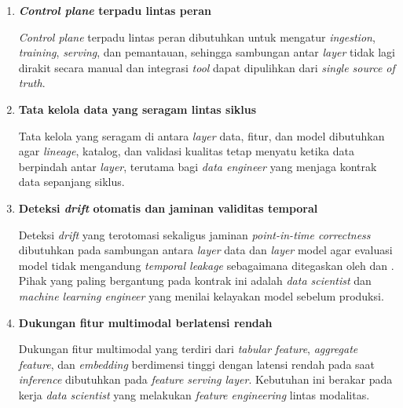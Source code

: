 \vspace{0.5em}
\begin{enumerate}
    \item \textbf{\textit{Control plane} terpadu lintas peran}

    \textit{Control plane} terpadu lintas peran dibutuhkan untuk mengatur \textit{ingestion}, \textit{training}, \textit{serving}, dan pemantauan, sehingga sambungan antar \textit{layer} tidak lagi dirakit secara manual dan integrasi \textit{tool} dapat dipulihkan dari \textit{single source of truth}.

    \vspace{0.5em}

    \item \textbf{Tata kelola data yang seragam lintas siklus}

    Tata kelola yang seragam di antara \textit{layer} data, fitur, dan model dibutuhkan agar \textit{lineage}, katalog, dan validasi kualitas tetap menyatu ketika data berpindah antar \textit{layer}, terutama bagi \textit{data engineer} yang menjaga kontrak data sepanjang siklus.

    \vspace{0.5em}

    \item \textbf{Deteksi \textit{drift} otomatis dan jaminan validitas temporal}

    Deteksi \textit{drift} yang terotomasi sekaligus jaminan \textit{point-in-time correctness} dibutuhkan pada sambungan antara \textit{layer} data dan \textit{layer} model agar evaluasi model tidak mengandung \textit{temporal leakage} sebagaimana ditegaskan oleh \textcite{vela2022temporal} dan \textcite{kaufman2012leakage}. Pihak yang paling bergantung pada kontrak ini adalah \textit{data scientist} dan \textit{machine learning engineer} yang menilai kelayakan model sebelum produksi.

    \vspace{0.5em}

    \item \textbf{Dukungan fitur multimodal berlatensi rendah}

    Dukungan fitur multimodal yang terdiri dari \textit{tabular feature}, \textit{aggregate feature}, dan \textit{embedding} berdimensi tinggi dengan latensi rendah pada saat \textit{inference} dibutuhkan pada \textit{feature serving layer}. Kebutuhan ini berakar pada kerja \textit{data scientist} yang melakukan \textit{feature engineering} lintas modalitas.
\end{enumerate}

